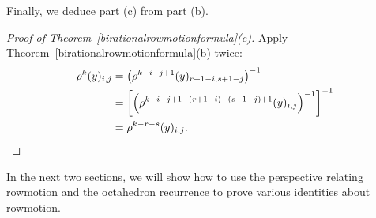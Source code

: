 








%
%

Finally, we deduce part (c) from part (b).
%

\begin{proof} [Proof of Theorem~\ref{birationalrowmotionformula}(c)]
Apply Theorem~\ref{birationalrowmotionformula}(b) twice:
\begin{align*}
    \rho^{k}(y)_{i,j} &= \left(\rho^{k-i-j+1}(y)_{r+1-i,s+1-j}\right)^{-1}\\ 
    &= \left[\left(\rho^{k-i-j+1-(r+1-i)-(s+1-j)+1}(y)_{i,j}\right)^{-1}\right]^{-1}\\
    & = \rho^{k-r-s}(y)_{i,j}.\qedhere
\end{align*}
\end{proof}

In the next two sections, we will show how to use the perspective relating rowmotion and the octahedron recurrence to prove various identities about rowmotion.
